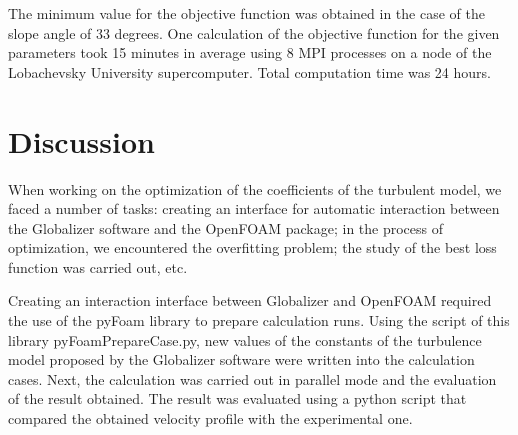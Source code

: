 \documentclass[mathematics,article,submit,pdftex,moreauthors]{Definitions/mdpi}
\begin{document}
The minimum value for the objective function was obtained in the case of the slope angle of 33 degrees. One calculation of the objective function for the given parameters took 15 minutes in average using 8 MPI processes on a node of the Lobachevsky University supercomputer. Total computation time was 24 hours.

\section{Discussion}

When working on the optimization of the coefficients of the turbulent model, we faced a number of tasks: creating an interface for automatic interaction between the Globalizer software and the OpenFOAM package; in the process of optimization, we encountered the overfitting problem; the study of the best loss function was carried out, etc.

Creating an interaction interface between Globalizer and OpenFOAM required the use of the pyFoam library to prepare calculation runs. Using the script of this library pyFoamPrepareCase.py, new values of the constants of the turbulence model proposed by the Globalizer software were written into the calculation cases. Next, the calculation was carried out in parallel mode and the evaluation of the result obtained. The result was evaluated using a python script that compared the obtained velocity profile with the experimental one.
\end{document}
